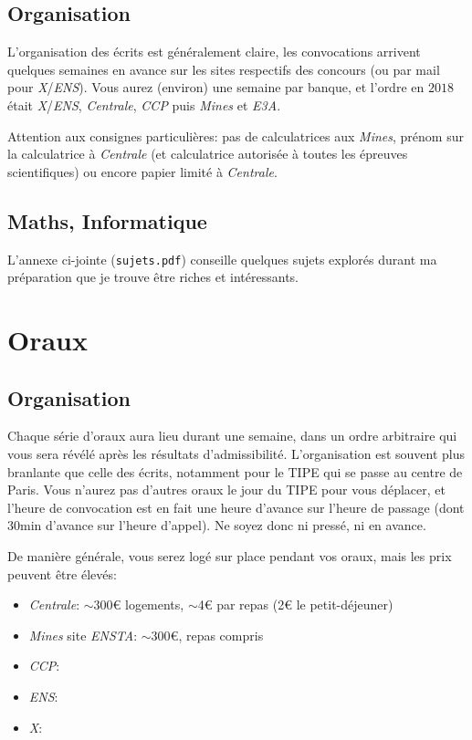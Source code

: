 \documentclass{article}
\begin{document}
\subsection{Organisation}
L'organisation des écrits est généralement claire, les convocations arrivent quelques semaines en avance sur les sites respectifs des concours (ou par mail pour \textit{X}/\textit{ENS}).
Vous aurez (environ) une semaine par banque, et l'ordre en $2018$ était \textit{X}/\textit{ENS}, \textit{Centrale}, \textit{CCP} puis \textit{Mines} et \textit{E3A}.

Attention aux consignes particulières: pas de calculatrices aux \textit{Mines}, prénom sur la calculatrice à \textit{Centrale} (et calculatrice autorisée à toutes les épreuves scientifiques) ou encore papier limité à \textit{Centrale}.

\subsection{Maths, Informatique}
L'annexe ci-jointe (\texttt{sujets.pdf}) conseille quelques sujets explorés durant ma préparation que je trouve être riches et intéressants.

\section{Oraux}
\subsection{Organisation}
Chaque série d'oraux aura lieu durant une semaine, dans un ordre arbitraire qui vous sera révélé après les résultats d'admissibilité.
L'organisation est souvent plus branlante que celle des écrits, notamment pour le TIPE qui se passe au centre de Paris.
Vous n'aurez pas d'autres oraux le jour du TIPE pour vous déplacer, et l'heure de convocation est en fait une heure d'avance sur l'heure de passage (dont 30min d'avance sur l'heure d'appel).
Ne soyez donc ni pressé, ni en avance.

De manière générale, vous serez logé sur place pendant vos oraux, mais les prix peuvent être élevés:


\begin{itemize}
\item  \textit{Centrale}: $\sim$300€ logements, $\sim$4€ par repas (2€ le petit-déjeuner)
\item  \textit{Mines} site \textit{ENSTA}: $\sim$300€, repas compris
\item  \textit{CCP}:
\item  \textit{ENS}:
\item  \textit{X}:

\end{itemize}
\end{document}
